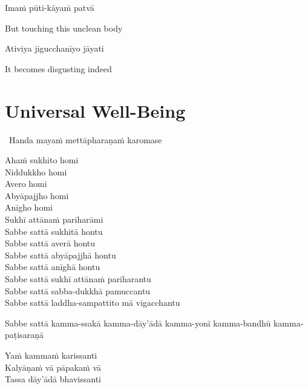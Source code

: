 Imaṁ pūti-kāyaṁ patvā

\begin{english}
  But touching this unclean body
\end{english}

Ativiya jigucchanīyo jāyati

\begin{english}
  It becomes disgusting indeed
\end{english}

\suttaRef{[Trad]}


\section{Universal Well-Being}
\label{universal-well-being}

\begin{leader}
  \anglebracketleft\ \hspace{-0.5mm}Handa mayaṁ mettāpharaṇaṁ karomase \hspace{-0.5mm}\anglebracketright\
\end{leader}

Ahaṁ sukhito homi\\
Niddukkho homi\\
Avero homi\\
Abyāpajjho homi\\
Anīgho homi\\
Sukhī attānaṁ pariharāmi\\
Sabbe sattā sukhitā hontu\\
Sabbe sattā averā hontu\\
Sabbe sattā abyāpajjhā hontu\\
Sabbe sattā anīghā hontu\\
Sabbe sattā sukhī attānaṁ pariharantu\\
Sabbe sattā sabba-dukkhā pamuccantu\\
Sabbe sattā laddha-sampattito mā vigacchantu

\bigskip

\begin{pali-hangtogether}
  Sabbe sattā kamma-ssakā kamma-dāy'ādā kamma-yonī kamma-bandhū kamma-paṭisaraṇā\\
\end{pali-hangtogether}
Yaṁ kammaṁ karissanti\\
Kalyāṇaṁ vā pāpakaṁ vā\\
Tassa dāy'ādā bhavissanti

